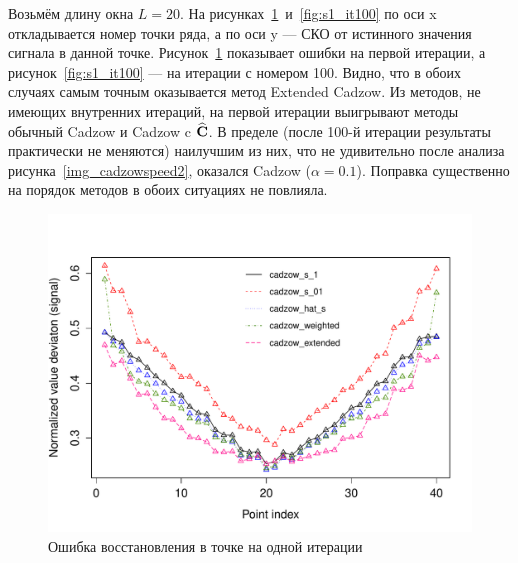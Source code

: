 \documentclass[12pt,a4paper,fleqn,leqno]{article}
\begin{document}
Возьмём длину окна $L=20$.  На рисунках~\ref{fig:s1_it1}~и~\ref{fig:s1_it100} по оси x откладывается номер точки ряда,
а по оси y --- СКО от истинного значения сигнала в данной точке. Рисунок~\ref{fig:s1_it1} показывает ошибки на первой итерации,
а рисунок~\ref{fig:s1_it100} --- на итерации с номером 100.
Видно, что в обоих случаях самым точным оказывается метод Extended Cadzow. Из методов, не имеющих внутренних итераций,
на первой итерации выигрывают методы обычный Cadzow и Cadzow c $\widehat{\mathbf{C}}$. В пределе (после 100-й итерации результаты практически не меняются)
наилучшим из них, что не удивительно после анализа рисунка~\ref{img_cadzowspeed2}, оказался Cadzow ($\alpha=0.1$). Поправка существенно на порядок методов в обоих ситуациях не повлияла.


\begin{figure}[!hhh] 
\begin{center}
\includegraphics[width = 15cm]{s1_it1.pdf}
\caption{Ошибка восстановления в точке на одной итерации}
\label{fig:s1_it1}
\end{center}
\end{figure}

\end{document}
